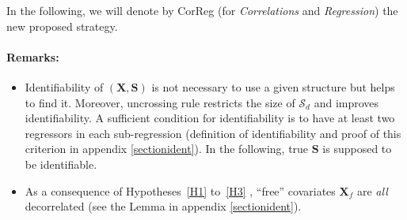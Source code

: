 \documentclass[12pt,a4paper]{report}
\begin{document}

In the following, we will denote by {\sc CorReg} (for {\it Correlations} and {\it Regression}) the new proposed strategy.

\paragraph{Remarks:} 
\begin{itemize}
\item Identifiability of $(\boldsymbol{X},\boldsymbol{S})$ is not necessary to use a given structure but helps to find it. Moreover, uncrossing rule restricts the size of $\mathcal{S}_d$ and improves identifiability. A sufficient condition for identifiability is to have at least two regressors in each sub-regression (definition of identifiability and proof of this criterion in appendix \ref{sectionident}). 
In the following, true $\boldsymbol{S}$ is supposed to be identifiable.
\item As a consequence of Hypotheses~\ref{H1} to~\ref{H3} , ``free'' covariates $\boldsymbol{X}_f$ are {\it all} decorrelated (see the Lemma in appendix \ref{sectionident}).
\end{itemize}
\end{document}
